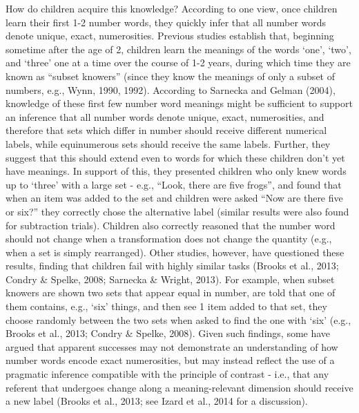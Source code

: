 \documentclass[
  man,floatsintext]{apa7}
\begin{document}
How do children acquire this knowledge? According to one view, once children learn their first 1-2 number words, they quickly infer that all number words denote unique, exact, numerosities. Previous studies establish that, beginning sometime after the age of 2, children learn the meanings of the words `one', `two', and `three' one at a time over the course of 1-2 years, during which time they are known as ``subset knowers'' (since they know the meanings of only a subset of numbers, e.g., Wynn, 1990, 1992). According to Sarnecka and Gelman (2004), knowledge of these first few number word meanings might be sufficient to support an inference that all number words denote unique, exact, numerosities, and therefore that sets which differ in number should receive different numerical labels, while equinumerous sets should receive the same labels. Further, they suggest that this should extend even to words for which these children don't yet have meanings. In support of this, they presented children who only knew words up to `three' with a large set - e.g., ``Look, there are five frogs'', and found that when an item was added to the set and children were asked ``Now are there five or six?'' they correctly chose the alternative label (similar results were also found for subtraction trials). Children also correctly reasoned that the number word should not change when a transformation does not change the quantity (e.g., when a set is simply rearranged). Other studies, however, have questioned these results, finding that children fail with highly similar tasks (Brooks et al., 2013; Condry \& Spelke, 2008; Sarnecka \& Wright, 2013). For example, when subset knowers are shown two sets that appear equal in number, are told that one of them contains, e.g., `six' things, and then see 1 item added to that set, they choose randomly between the two sets when asked to find the one with `six' (e.g., Brooks et al., 2013; Condry \& Spelke, 2008). Given such findings, some have argued that apparent successes may not demonstrate an understanding of how number words encode exact numerosities, but may instead reflect the use of a pragmatic inference compatible with the principle of contrast - i.e., that any referent that undergoes change along a meaning-relevant dimension should receive a new label (Brooks et al., 2013; see Izard et al., 2014 for a discussion).
\end{document}
